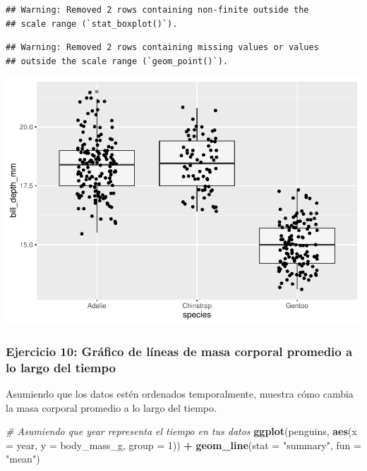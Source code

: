 \documentclass[
]{book}
\newenvironment{Shaded}{\begin{snugshade}}{\end{snugshade}}
\newcommand{\AttributeTok}[1]{\textcolor[rgb]{0.13,0.29,0.53}{#1}}
\newcommand{\CommentTok}[1]{\textcolor[rgb]{0.56,0.35,0.01}{\textit{#1}}}
\newcommand{\DecValTok}[1]{\textcolor[rgb]{0.00,0.00,0.81}{#1}}
\newcommand{\FunctionTok}[1]{\textcolor[rgb]{0.13,0.29,0.53}{\textbf{#1}}}
\newcommand{\NormalTok}[1]{#1}
\newcommand{\SpecialCharTok}[1]{\textcolor[rgb]{0.81,0.36,0.00}{\textbf{#1}}}
\newcommand{\StringTok}[1]{\textcolor[rgb]{0.31,0.60,0.02}{#1}}
\begin{document}
\begin{verbatim}
## Warning: Removed 2 rows containing non-finite outside the
## scale range (`stat_boxplot()`).
\end{verbatim}

\begin{verbatim}
## Warning: Removed 2 rows containing missing values or values
## outside the scale range (`geom_point()`).
\end{verbatim}

\includegraphics{bookdown-demo_files/figure-latex/unnamed-chunk-191-1.pdf}

\subsubsection{Ejercicio 10: Gráfico de líneas de masa corporal promedio a lo largo del tiempo}\label{ejercicio-10-gruxe1fico-de-luxedneas-de-masa-corporal-promedio-a-lo-largo-del-tiempo}

Asumiendo que los datos estén ordenados temporalmente, muestra cómo cambia la masa corporal promedio a lo largo del tiempo.

\begin{Shaded}
\begin{Highlighting}[]
\CommentTok{\# Asumiendo que \textquotesingle{}year\textquotesingle{} representa el tiempo en tus datos}
\FunctionTok{ggplot}\NormalTok{(penguins, }\FunctionTok{aes}\NormalTok{(}\AttributeTok{x =}\NormalTok{ year, }\AttributeTok{y =}\NormalTok{ body\_mass\_g, }\AttributeTok{group =} \DecValTok{1}\NormalTok{)) }\SpecialCharTok{+}
  \FunctionTok{geom\_line}\NormalTok{(}\AttributeTok{stat =} \StringTok{"summary"}\NormalTok{, }\AttributeTok{fun =} \StringTok{"mean"}\NormalTok{)}
\end{Highlighting}
\end{Shaded}
\end{document}
